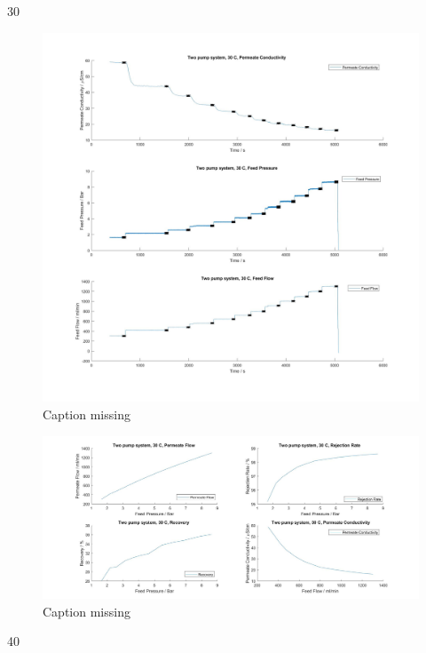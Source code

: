 30


\begin{figure}[H]
    \centering
    \includegraphics[width=1.1\textwidth]{FeedPumpIncrease30}
    \caption{Caption missing}
    \label{fig:PressConn}
\end{figure}


\begin{figure}[H]
    \centering
    \includegraphics[width=1.1\textwidth]{FeedPumpIncrease30Key}
    \caption{Caption missing}
    \label{fig:PressConn}
\end{figure}

40


